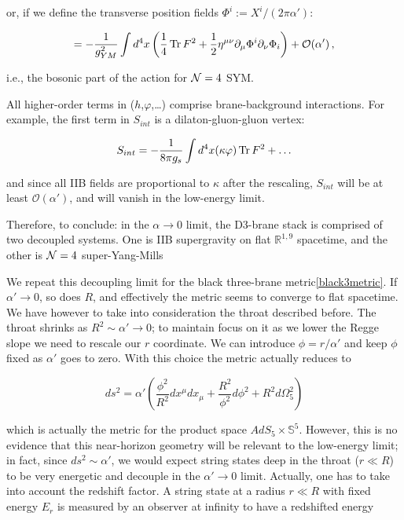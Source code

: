 or, if we define the transverse position fields $\Phi^i := X^i / (2\pi\alpha')$:

\begin{equation}
	= - \frac{1}{g_{YM}^2} \int d^4 x \left( \frac{1}{4} \operatorname{Tr} F^2 + \frac{1}{2} \eta^{\mu\nu} \partial_\mu \Phi^i \partial_\nu \Phi_i \right) + \mathcal{O}(\alpha')\,,
	\label{}
\end{equation}

i.e., the bosonic part of the action for $\mathcal{N} = 4$ SYM.

All higher-order terms in ($h$,$\varphi$,\ldots) comprise brane-background interactions. For example, the first term in $S_{int}$ is a dilaton-gluon-gluon vertex:

\begin{equation}
	S_{int} = - \frac{1}{8\pi g_s} \int d^4 x (\kappa \varphi) \operatorname{Tr} F^2 + \ldots
	\label{}
\end{equation}

and since all IIB fields are proportional to $\kappa$ after the rescaling, $S_{int}$ will be at least $\mathcal{O}(\alpha')$, and will vanish in the low-energy limit.

Therefore, to conclude: in the $\alpha \rightarrow 0$ limit, the D3-brane stack is comprised of two decoupled systems. One is IIB supergravity on flat $\mathbb{R}^{1,9}$ spacetime, and the other is $\mathcal{N}=4$ super-Yang-Mills

We repeat this decoupling limit for the black three-brane metric\eqref{black3metric}. If $\alpha' \rightarrow 0$, so does $R$, and effectively the metric seems to converge to flat spacetime. We have however to take into consideration the throat described before. The throat shrinks as $R^2 \sim \alpha' \rightarrow 0$; to maintain focus on it as we lower the Regge slope we need to rescale our $r$ coordinate. We can introduce $\phi = r/\alpha'$ and keep $\phi$ fixed as $\alpha'$ goes to zero. With this choice the metric actually reduces to

\begin{equation}
	ds^2 = \alpha' \left( \frac{\phi^2 }{R^2}dx^\mu dx_\mu + \frac{R^2}{\phi^2} d\phi^2 + R^2 d\Omega_5^2 \right)
	\label{}
\end{equation}

which is actually the metric for the product space $AdS_5 \times \mathbb{S}^5$. However, this is no evidence that this near-horizon geometry will be relevant to the low-energy limit; in fact, since $ds^2 \sim \alpha'$, we would expect string states deep in the throat ($r \ll R$) to be very energetic and decouple in the $\alpha' \rightarrow 0$ limit. Actually, one has to take into account the redshift factor. A string state at a radius $r \ll R$ with fixed energy $E_r$ is measured by an observer at infinity to have a redshifted energy

